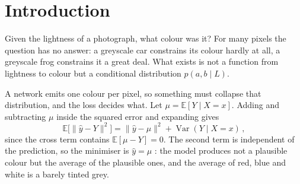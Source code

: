 \documentclass{article}
\begin{document}

\printAffiliationsAndNotice{}

\begin{abstract}
%
Colourising a greyscale photograph has no single correct answer: a grey car is
consistent with red, blue or white, and under a squared error the optimal
prediction is then the mean of the plausible colours, which is close to grey.
Two colourisers are trained on CIFAR-10 with everything but the loss held fixed,
the second reading its predicted distribution at a temperature that interpolates
between that distribution's mean and its mode. Sweeping it traces a frontier on
which accuracy and colour variety cannot both be maximised. At temperature one
the classification network reproduces the squared error network pixel by pixel,
\MechSameBare{} apart against the \MechTruthBare{} separating either from the
truth, and does so across independent seeds: the desaturation is a property of the question
the loss asks, not of a model or a run.
%
\end{abstract}

\section{Introduction}

Given the lightness of a photograph, what colour was it? For many pixels the
question has no answer: a greyscale car constrains its colour hardly at all, a
greyscale frog constrains it a great deal. What exists is not a function from
lightness to colour but a conditional distribution $p(a,b \mid L)$.

A network emits one colour per pixel, so something must collapse that
distribution, and the loss decides what. Let $\mu = \mathbb{E}[Y \mid X = x]$.
Adding and subtracting $\mu$ inside the squared error and expanding gives
%
\begin{equation}\label{eq:mean}
\mathbb{E}\big[\lVert \hat{y} - Y \rVert^2\big]
  = \lVert \hat{y} - \mu \rVert^2 + \operatorname{Var}(Y \mid X = x)\,,
\end{equation}
%
since the cross term contains $\mathbb{E}[\mu - Y] = 0$. The second term is
independent of the prediction, so the minimiser is $\hat{y} = \mu$
\cite{bishop2006pattern}: the model produces not a plausible colour but the
average of the plausible ones, and the average of red, blue and white is a
barely tinted grey.
\end{document}
